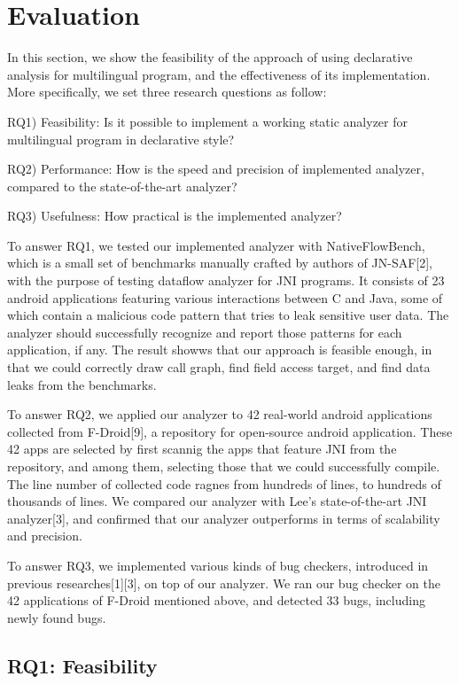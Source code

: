 \section{Evaluation}
In this section, we show the feasibility of the approach of using declarative
analysis for multilingual program, and the effectiveness of its
implementation. More specifically, we set three research questions as follow:

RQ1) Feasibility: Is it possible to implement a working static analyzer for multilingual program in declarative style?

RQ2) Performance: How is the speed and precision of implemented analyzer, compared to the state-of-the-art analyzer?

RQ3) Usefulness: How practical is the implemented analyzer?

To answer RQ1, we tested our implemented analyzer with NativeFlowBench, which
is a small set of benchmarks manually crafted by authors of JN-SAF[2], with the
purpose of testing dataflow analyzer for JNI programs. It consists of 23
android applications featuring various interactions between C and Java, some of
which contain a malicious code pattern that tries to leak sensitive user data.
The analyzer should successfully recognize and report those patterns for each
application, if any. The result showws that our approach is feasible enough,
in that we could correctly draw call graph, find field access target, and
find data leaks from the benchmarks.

To answer RQ2, we applied our analyzer to 42 real-world android applications
collected from F-Droid[9], a repository for open-source android application.
These 42 apps are selected by first scannig the apps that feature JNI from the
repository, and among them, selecting those that we could successfully compile.
The line number of collected code ragnes from hundreds of lines, to hundreds of
thousands of lines.  We compared our analyzer with Lee's state-of-the-art JNI
analyzer[3], and confirmed that our analyzer outperforms in terms of
scalability and precision.

To answer RQ3, we implemented various kinds of bug checkers, introduced in
previous researches[1][3], on top of our analyzer. We ran our bug checker on
the 42 applications of F-Droid mentioned above, and detected 33 bugs,
including  newly found bugs.

\subsection{RQ1: Feasibility}


